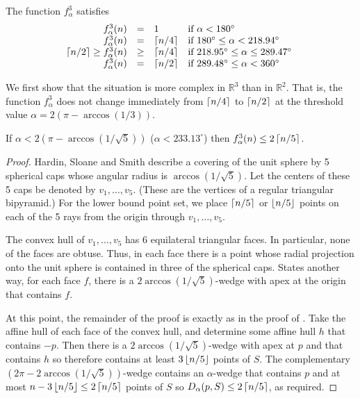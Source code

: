 \documentclass[lotsofwhite]{patmorin}
\begin{document}
\newcommand{\degrees}{^\circ}

\begin{cor}
The function $f_\alpha^3$ satisfies
\[\begin{array}{rcll}
  f^3_\alpha(n) & = & 1 & \mbox{if $\alpha < 180\degrees$} \\
  f^3_\alpha(n) & = & \ceil{n/4} & 
    \mbox{if $180\degrees \le \alpha < 218.94\degrees$} \\
\ceil{n/2}\ge  f^3_\alpha(n) & \ge & \ceil{n/4} & 
    \mbox{if $218.95\degrees \le \alpha \le 289.47\degrees$ } \\
  f^3_\alpha(n) & = & \ceil{n/2} & 
    \mbox{if $289.48\degrees\le \alpha < 360\degrees$} \\
\end{array}\]
\end{cor}





We first show that the situation is more complex in $\mathbb{R}^3$
than in $\mathbb{R}^2$.  That is, the function $f_\alpha^3$ does not
change immediately from $\left\lceil n/4 \right\rceil$ to $\left\lceil n/2 \right\rceil$ at the threshold
value $\alpha=2(\pi-\arccos(1/3))$.

\begin{lem}
If $\alpha < 2(\pi-\arccos(1/\sqrt{5}))$ ($\alpha < 233.13\degrees$) then $f^3_\alpha(n) \le 2\left\lceil n/5 \right\rceil$.
\end{lem}

\begin{proof}
Hardin, Sloane and Smith \cite{hssXX} describe a covering of the unit
sphere by 5 spherical caps whose angular radius is
$\arccos(1/\sqrt{5})$.  Let the centers of these 5 caps be denoted by
$v_1,\ldots,v_5$. (These are the vertices of a regular triangular
bipyramid.) For the lower bound point set, we place $\left\lceil n/5 \right\rceil$ or
$\left\lfloor n/5 \right\rfloor$ points on each of the 5 rays from the origin through
$v_1,\ldots,v_5$. 

The convex hull of $v_1,\ldots,v_5$ has 6 equilateral triangular
faces.  In particular, none of the faces are obtuse.  Thus, in each
face there is a point whose radial projection onto the unit sphere is
contained in three of the spherical caps. States another way, for each
face $f$, there is a $2\arccos(1/\sqrt{5})$-wedge with apex at the
origin that contains $f$.

At this point, the remainder of the proof is exactly as in the proof
of .  Take the affine hull of each face of the convex
hull, and determine some affine hull $h$ that contains $-p$.  Then
there is a $2\arccos(1/\sqrt{5})$-wedge with apex at $p$ and that
contains $h$ so therefore contains at least $3\left\lfloor n/5 \right\rfloor$ points of
$S$.  The complementary $(2\pi-2\arccos(1/\sqrt{5}))$-wedge contains
an $\alpha$-wedge that contains $p$ and at most $n-3\left\lfloor n/5 \right\rfloor\le
2\left\lceil n/5 \right\rceil$ points of $S$ so $D_\alpha(p,S)\le 2\left\lceil n/5 \right\rceil$, as
required.  
\end{proof}
\end{document}
